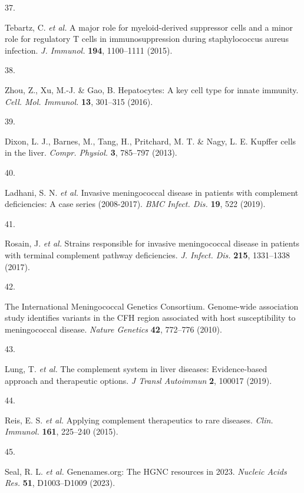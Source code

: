 \documentclass[
sn-nature
]{sn-jnl}
\newlength{\cslhangindent}
\newlength{\csllabelwidth}
\newenvironment{CSLReferences}[2] %
 {\begin{list}{}{%
  \setlength{\itemindent}{0pt}
  \setlength{\leftmargin}{0pt}
  \setlength{\parsep}{0pt}
  \ifodd #1
   \setlength{\leftmargin}{\cslhangindent}
   \setlength{\itemindent}{-1\cslhangindent}
  \fi
  \setlength{\itemsep}{#2\baselineskip}}}
 {\end{list}}
\newcommand{\CSLLeftMargin}[1]{\parbox[t]{\csllabelwidth}{\strut#1\strut}}
\newcommand{\CSLRightInline}[1]{\parbox[t]{\linewidth - \csllabelwidth}{\strut#1\strut}}
\begin{document}
\begin{CSLReferences}{0}{0}
\CSLLeftMargin{37. }%
\CSLRightInline{Tebartz, C. \emph{et al.} A major role for
myeloid-derived suppressor cells and a minor role for regulatory {T}
cells in immunosuppression during staphylococcus aureus infection.
\emph{J. Immunol.} \textbf{194}, 1100--1111 (2015).}

\CSLLeftMargin{38. }%
\CSLRightInline{Zhou, Z., Xu, M.-J. \& Gao, B. Hepatocytes: A key cell
type for innate immunity. \emph{Cell. Mol. Immunol.} \textbf{13},
301--315 (2016).}

\CSLLeftMargin{39. }%
\CSLRightInline{Dixon, L. J., Barnes, M., Tang, H., Pritchard, M. T. \&
Nagy, L. E. Kupffer cells in the liver. \emph{Compr. Physiol.}
\textbf{3}, 785--797 (2013).}

\CSLLeftMargin{40. }%
\CSLRightInline{Ladhani, S. N. \emph{et al.} Invasive meningococcal
disease in patients with complement deficiencies: A case series
(2008-2017). \emph{BMC Infect. Dis.} \textbf{19}, 522 (2019).}

\CSLLeftMargin{41. }%
\CSLRightInline{Rosain, J. \emph{et al.} Strains responsible for
invasive meningococcal disease in patients with terminal complement
pathway deficiencies. \emph{J. Infect. Dis.} \textbf{215}, 1331--1338
(2017).}

\CSLLeftMargin{42. }%
\CSLRightInline{The International Meningococcal Genetics Consortium.
Genome-wide association study identifies variants in the {CFH} region
associated with host susceptibility to meningococcal disease.
\emph{Nature Genetics} \textbf{42}, 772--776 (2010).}

\CSLLeftMargin{43. }%
\CSLRightInline{Lung, T. \emph{et al.} The complement system in liver
diseases: Evidence-based approach and therapeutic options. \emph{J
Transl Autoimmun} \textbf{2}, 100017 (2019).}

\CSLLeftMargin{44. }%
\CSLRightInline{Reis, E. S. \emph{et al.} Applying complement
therapeutics to rare diseases. \emph{Clin. Immunol.} \textbf{161},
225--240 (2015).}

\CSLLeftMargin{45. }%
\CSLRightInline{Seal, R. L. \emph{et al.} Genenames.org: The {HGNC}
resources in 2023. \emph{Nucleic Acids Res.} \textbf{51}, D1003--D1009
(2023).}


\end{CSLReferences}
\end{document}
